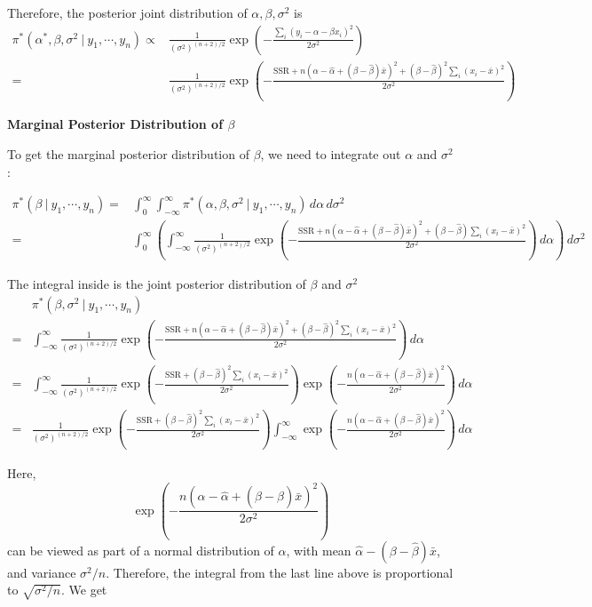 \documentclass[]{book}
\theoremstyle{definition}
\theoremstyle{definition}
\theoremstyle{definition}
\theoremstyle{remark}
\begin{document}
Therefore, the posterior joint distribution of
\(\alpha, \beta, \sigma^2\) is \[ 
\begin{aligned}
\pi^*(\alpha^*, \beta,\sigma^2 ~|~y_1,\cdots, y_n) \propto & \frac{1}{(\sigma^2)^{(n+2)/2}}\exp\left(-\frac{\sum_i(y_i - \alpha - \beta x_i)^2}{2\sigma^2}\right) \\
= & \frac{1}{(\sigma^2)^{(n+2)/2}}\exp\left(-\frac{\text{SSR} + n(\alpha-\hat{\alpha}+(\beta-\hat{\beta})\bar{x})^2 + (\beta - \hat{\beta})^2\sum_i (x_i-\bar{x})^2}{2\sigma^2}\right)
\end{aligned}
\]

\textbf{Marginal Posterior Distribution of \(\beta\)}

To get the marginal posterior distribution of \(\beta\), we need to
integrate out \(\alpha\) and \(\sigma^2\):

\[
\begin{aligned}
\pi^*(\beta ~|~y_1,\cdots,y_n) = & \int_0^\infty \int_{-\infty}^\infty \pi^*(\alpha, \beta, \sigma^2~|~y_1,\cdots, y_n)\, d\alpha\, d\sigma^2 \\
= & \int_0^\infty \left(\int_{-\infty}^\infty \frac{1}{(\sigma^2)^{(n+2)/2}}\exp\left(-\frac{\text{SSR} + n(\alpha-\hat{\alpha}+(\beta-\hat{\beta})\bar{x})^2+(\beta-\hat{\beta})\sum_i(x_i-\bar{x})^2}{2\sigma^2}\right)\, d\alpha\right)\, d\sigma^2
\end{aligned}
\]

The integral inside is the joint posterior distribution of \(\beta\) and
\(\sigma^2\) \[
\begin{aligned}
& \pi^*(\beta, \sigma^2~|~y_1,\cdots,y_n) \\
= & \int_{-\infty}^\infty \frac{1}{(\sigma^2)^{(n+2)/2}}\exp\left(-\frac{\text{SSR}+n(\alpha-\hat{\alpha}+(\beta-\hat{\beta})\bar{x})^2+(\beta-\hat{\beta})^2\sum_i(x_i-\bar{x})^2}{2\sigma^2}\right)\, d\alpha\\
= & \int_{-\infty}^\infty \frac{1}{(\sigma^2)^{(n+2)/2}}\exp\left(-\frac{\text{SSR}+(\beta-\hat{\beta})^2\sum_i(x_i-\bar{x})^2}{2\sigma^2}\right) \exp\left(-\frac{n(\alpha-\hat{\alpha}+(\beta-\hat{\beta})\bar{x})^2}{2\sigma^2}\right)\, d\alpha \\
= & \frac{1}{(\sigma^2)^{(n+2)/2}}\exp\left(-\frac{\text{SSR}+(\beta-\hat{\beta})^2\sum_i(x_i-\bar{x})^2}{2\sigma^2}\right) \int_{-\infty}^\infty \exp\left(-\frac{n(\alpha-\hat{\alpha}+(\beta-\hat{\beta})\bar{x})^2}{2\sigma^2}\right)\, d\alpha
\end{aligned}
\]

Here,
\[ \exp\left(-\frac{n(\alpha-\hat{\alpha}+(\beta - \hat{\beta})\bar{x})^2}{2\sigma^2}\right) \]
can be viewed as part of a normal distribution of \(\alpha\), with mean
\(\hat{\alpha}-(\beta-\hat{\beta})\bar{x}\), and variance
\(\sigma^2/n\). Therefore, the integral from the last line above is
proportional to \(\sqrt{\sigma^2/n}\). We get
\end{document}
